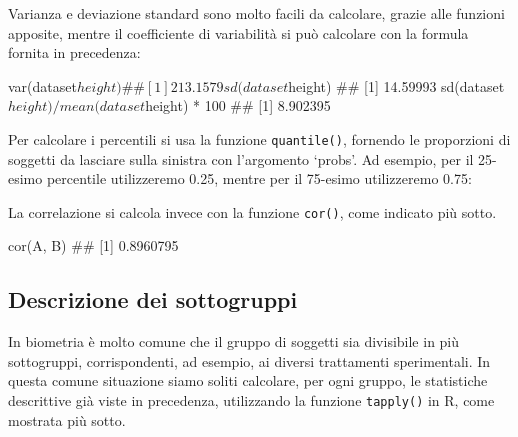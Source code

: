 \documentclass[a4paper,12pt,oneside]{book}
\newenvironment{Shaded}{\begin{snugshade}}{\end{snugshade}}
\newcommand{\DecValTok}[1]{#1}
\newcommand{\FloatTok}[1]{#1}
\newcommand{\SpecialCharTok}[1]{#1}
\newcommand{\DocumentationTok}[1]{#1}
\newcommand{\FunctionTok}[1]{#1}
\newcommand{\AttributeTok}[1]{#1}
\newcommand{\NormalTok}[1]{#1}
\begin{document}
Varianza e deviazione standard sono molto facili da calcolare, grazie alle funzioni apposite, mentre il coefficiente di variabilità si può calcolare con la formula fornita in precedenza:

\begin{Shaded}
\begin{Highlighting}[]
\FunctionTok{var}\NormalTok{(dataset}\SpecialCharTok{$}\NormalTok{height)}
\DocumentationTok{\#\# [1] 213.1579}
\FunctionTok{sd}\NormalTok{(dataset}\SpecialCharTok{$}\NormalTok{height)}
\DocumentationTok{\#\# [1] 14.59993}
\FunctionTok{sd}\NormalTok{(dataset}\SpecialCharTok{$}\NormalTok{height)}\SpecialCharTok{/}\FunctionTok{mean}\NormalTok{(dataset}\SpecialCharTok{$}\NormalTok{height) }\SpecialCharTok{*} \DecValTok{100}
\DocumentationTok{\#\# [1] 8.902395}
\end{Highlighting}
\end{Shaded}

Per calcolare i percentili si usa la funzione \texttt{quantile()}, fornendo le proporzioni di soggetti da lasciare sulla sinistra con l'argomento `probs'. Ad esempio, per il 25-esimo percentile utilizzeremo 0.25, mentre per il 75-esimo utilizzeremo 0.75:

\begin{Shaded}
\end{Shaded}

La correlazione si calcola invece con la funzione \texttt{cor()}, come indicato più sotto.

\begin{Shaded}
\begin{Highlighting}[]
\FunctionTok{cor}\NormalTok{(A, B)}
\DocumentationTok{\#\# [1] 0.8960795}
\end{Highlighting}
\end{Shaded}

\hypertarget{descrizione-dei-sottogruppi}{%
\subsection{Descrizione dei sottogruppi}\label{descrizione-dei-sottogruppi}}

In biometria è molto comune che il gruppo di soggetti sia divisibile in più sottogruppi, corrispondenti, ad esempio, ai diversi trattamenti sperimentali. In questa comune situazione siamo soliti calcolare, per ogni gruppo, le statistiche descrittive già viste in precedenza, utilizzando la funzione \texttt{tapply()} in R, come mostrata più sotto.
\end{document}
